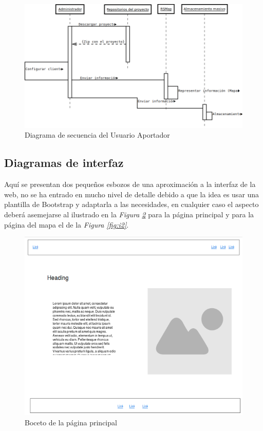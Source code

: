 \newpage

\begin{figure}[!h]
  \begin{center}
  \includegraphics[scale=0.45]{../images/diag_plan/seq_user_ap.png}
  \caption{Diagrama de secuencia del Usuario Aportador}
  \label{fig:ar_rsmap}
  \end{center}
\end{figure}

\newpage

\subsection{Diagramas de interfaz}

Aquí se presentan dos pequeños esbozos de una aproximación a la interfaz de la web, no se ha entrado en mucho nivel de detalle debido a que la idea es usar una plantilla de Bootstrap y adaptarla a las necesidades, en cualquier caso el aspecto deberá asemejarse al ilustrado en la \textit{Figura \ref{fig:i1}} para la página principal y para la página del mapa el de la \textit{Figura \ref{fig:i2}}.

\begin{figure}[!ht]
  \begin{center}
  \includegraphics[scale=0.6]{../images/diag_plan/ui_general.png}
  \caption{Boceto de la página principal}
  \label{fig:i1}
  \end{center}
\end{figure}


